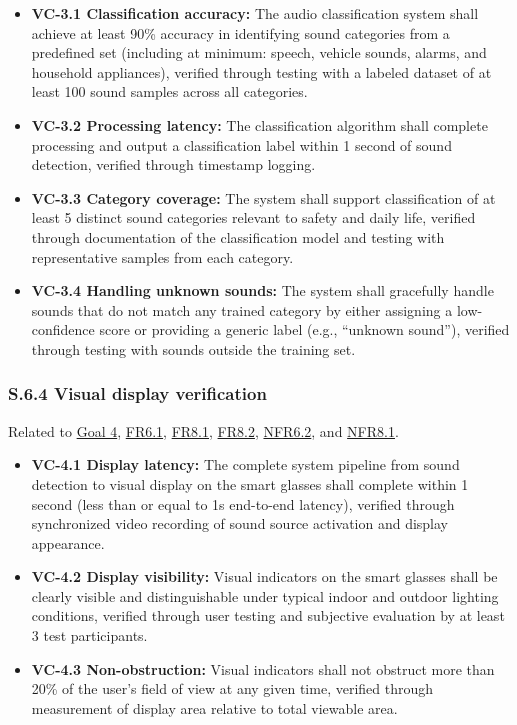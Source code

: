 \documentclass[12pt]{article}
\theoremstyle{definition}
\begin{document}
\begin{itemize}
\item \textbf{VC-3.1 Classification accuracy:} The audio classification system 
shall achieve at least 90\% accuracy in identifying sound categories from a 
predefined set (including at minimum: speech, vehicle sounds, alarms, and 
household appliances), verified through testing with a labeled dataset of at 
least 100 sound samples across all categories.

\item \textbf{VC-3.2 Processing latency:} The classification algorithm shall 
complete processing and output a classification label within 1 second of 
sound detection, verified through timestamp logging.

\item \textbf{VC-3.3 Category coverage:} The system shall support 
classification of at least 5 distinct sound categories relevant to safety 
and daily life, verified through documentation of the classification model 
and testing with representative samples from each category.

\item \textbf{VC-3.4 Handling unknown sounds:} The system shall gracefully 
handle sounds that do not match any trained category by either assigning a 
low-confidence score or providing a generic label (e.g., ``unknown sound''), 
verified through testing with sounds outside the training set.
\end{itemize}

\subsubsection{S.6.4 Visual display verification}

Related to \hyperref[goal:visual_display]{Goal 4}, \hyperref[FR6_1]{FR6.1}, 
\hyperref[FR8_1]{FR8.1}, \hyperref[FR8_2]{FR8.2}, \hyperref[NFR6_2]{NFR6.2}, 
and \hyperref[NFR8_1]{NFR8.1}.

\begin{itemize}
\item \textbf{VC-4.1 Display latency:} The complete system pipeline from sound 
detection to visual display on the smart glasses shall complete within 1 
second (less than or equal to 1s end-to-end latency), verified through 
synchronized video recording of sound source activation and display appearance.

\item \textbf{VC-4.2 Display visibility:} Visual indicators on the smart 
glasses shall be clearly visible and distinguishable under typical indoor 
and outdoor lighting conditions, verified through user testing and subjective 
evaluation by at least 3 test participants.

\item \textbf{VC-4.3 Non-obstruction:} Visual indicators shall not obstruct 
more than 20\% of the user's field of view at any given time, verified 
through measurement of display area relative to total viewable area.
\end{itemize}
\end{document}
